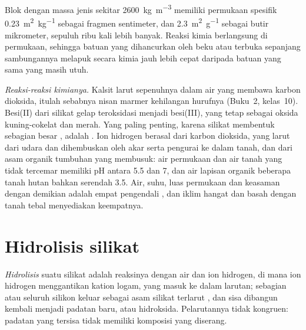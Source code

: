 Blok  dengan massa jenis sekitar \qty{2600}{kg.m^{-3}} memiliki permukaan spesifik \qty{0.23}{m^2.kg^{-1}} sebagai fragmen sentimeter, dan \qty{2.3}{m^2.g^{-1}} sebagai butir mikrometer, sepuluh ribu kali lebih banyak. Reaksi kimia berlangsung di permukaan, sehingga batuan yang dihancurkan oleh beku atau terbuka sepanjang sambungannya melapuk secara kimia jauh lebih cepat daripada batuan yang sama yang masih utuh.

\emph{Reaksi-reaksi kimianya.} Kalsit larut sepenuhnya dalam air yang membawa karbon dioksida, itulah sebabnya nisan marmer kehilangan hurufnya (Buku~2, kelas~10). Besi(II) dari silikat gelap teroksidasi menjadi besi(III), yang tetap sebagai oksida kuning-cokelat dan merah. Yang paling penting, karena silikat membentuk sebagian besar , adalah . Ion hidrogen berasal dari karbon dioksida, yang larut dari udara dan dihembuskan oleh akar serta pengurai ke dalam tanah, dan dari asam organik tumbuhan yang membusuk: air permukaan dan air tanah yang tidak tercemar memiliki pH antara 5.5 dan 7, dan air lapisan organik beberapa tanah hutan bahkan serendah 3.5. Air, suhu, luas permukaan dan keasaman dengan demikian adalah empat pengendali , dan iklim hangat dan basah dengan tanah tebal menyediakan keempatnya.

\section{Hidrolisis silikat}\label{sec:b1:weathering-clays:hydrolysis}

\begin{definition}\label{def:b1:weathering-clays:hydrolysis}
\emph{Hidrolisis} suatu silikat adalah reaksinya dengan air dan ion hidrogen, di mana ion hidrogen menggantikan kation logam, yang masuk ke dalam larutan; sebagian atau seluruh silikon keluar sebagai asam silikat terlarut , dan sisa  dibangun kembali menjadi padatan baru,  atau hidroksida. Pelarutannya tidak kongruen: padatan yang tersisa tidak memiliki komposisi  yang diserang.
\end{definition}


